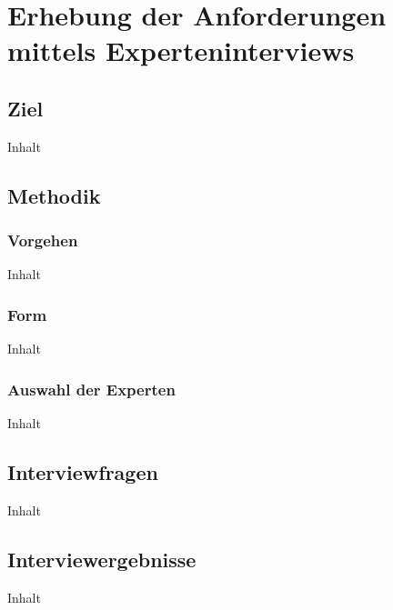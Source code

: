 \section{Erhebung der Anforderungen mittels Experteninterviews}
\label{sec:04-01_collection-of-requirements-using-expert-interviews}

\subsection{Ziel}
\label{subsec:04-01-01_goal}

Inhalt

\subsection{Methodik}
\label{subsec:04-01-02_methodology}

\subsubsection{Vorgehen}
\label{subsubsec:04-01-02-01_procedure}

Inhalt

\subsubsection{Form}
\label{subsubsec:04-01-02-02_form}

Inhalt

\subsubsection{Auswahl der Experten}
\label{subsubsec:04-01-02-03_selection-of-experts}

Inhalt

\subsection{Interviewfragen}
\label{subsec:04-01-03_interview-questions}

Inhalt

\subsection{Interviewergebnisse}
\label{subsec:04-01-04_interview-results}

Inhalt
